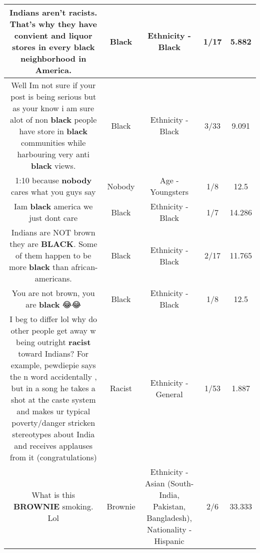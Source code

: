 \documentclass[11pt]{article}
\newlength\mylength
\begin{document}
\begin{center}
\begin{longtable}{|C{.65\mylength}|C{.30\mylength}|C{.12\mylength}|C{.12\mylength}|C{.12\mylength}|}
  \small Indians aren't racists. That's why they have convient and liquor stores in every \textbf{black} neighborhood in America.\normalsize   & Black & Ethnicity - Black & 1/17 & 5.882 \\  \hline
  \small Well Im not sure if your post is being serious but as your know i am sure alot of non \textbf{black} people have store in \textbf{black} communities while harbouring very anti \textbf{black} views.\normalsize   & Black & Ethnicity - Black & 3/33 & 9.091 \\  \hline
  \small 1:10 because \textbf{nobody} cares what you guys say\normalsize   & Nobody & Age - Youngsters & 1/8 & 12.5 \\  \hline
  \small Iam \textbf{black} america we just dont care\normalsize   & Black & Ethnicity - Black & 1/7 & 14.286 \\  \hline
  \small Indians are NOT brown they are \textbf{BLACK}. Some of them happen to be more \textbf{black} than african-americans.\normalsize   & Black & Ethnicity - Black & 2/17 & 11.765 \\  \hline
  \small You are not brown, you are \textbf{black} 😂😂\normalsize   & Black & Ethnicity - Black & 1/8 & 12.5 \\  \hline
  \small I beg to differ lol why do other people get away w being outright \textbf{racist} toward Indians? For example, pewdiepie says the n word accidentally , but in a song he takes a shot at the caste system and makes ur typical poverty/danger stricken stereotypes about India and receives applauses from it (congratulations)\normalsize   & Racist & Ethnicity - General & 1/53 & 1.887 \\  \hline
  \small What is this \textbf{B\textbf{ROWNIE}} smoking. Lol\normalsize   & Brownie & Ethnicity - Asian (South- India, Pakistan, Bangladesh), Nationality - Hispanic & 2/6 & 33.333 \\  \hline

\end{longtable}
\end{center}
\end{document}
